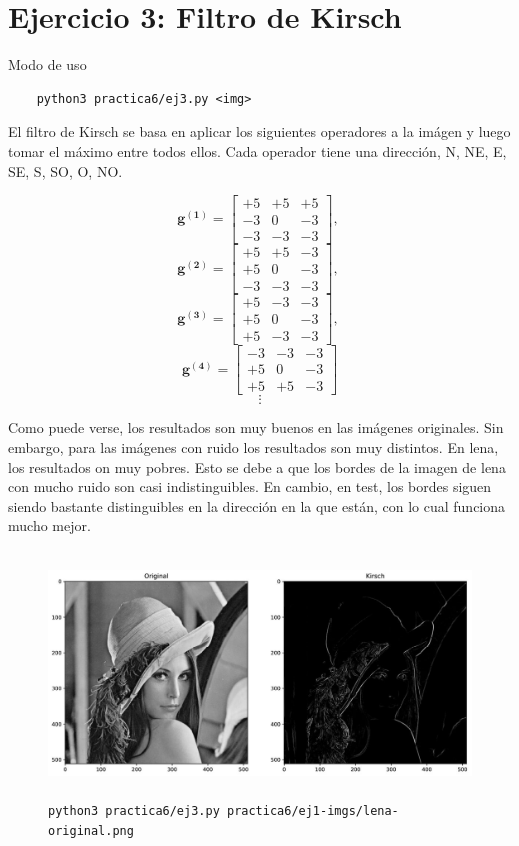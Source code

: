 \documentclass[11pt, spanish]{article}
\begin{document}
\newpage
\section{Ejercicio 3: Filtro de Kirsch}

Modo de uso
\begin{verbatim}
    python3 practica6/ej3.py <img>
\end{verbatim}

El filtro de Kirsch se basa en aplicar los siguientes operadores a la imágen y luego tomar el máximo entre todos ellos. Cada operador tiene una dirección, N, NE, E, SE, S, SO, O, NO. 

\[
\mathbf{g^{(1)}} = \begin{bmatrix} 
+5 & +5 & +5 \\
-3 &  0 & -3 \\
-3 & -3 & -3 
\end{bmatrix},\
\]
\[
\mathbf{g^{(2)}} = \begin{bmatrix} 
+5 & +5 & -3 \\
+5 &  0 & -3 \\
-3 & -3 & -3 
\end{bmatrix},\ 
\]
\[
\mathbf{g^{(3)}} = \begin{bmatrix} 
+5 & -3 & -3 \\
+5 &  0 & -3 \\
+5 & -3 & -3 
\end{bmatrix},\ 
\]
\[
\mathbf{g^{(4)}} = \begin{bmatrix} 
-3 & -3 & -3 \\
+5 &  0 & -3 \\
+5 & +5 & -3 
\end{bmatrix}
\]
\[
\vdots
\]

Como puede verse, los resultados son muy buenos en las imágenes originales. Sin embargo, para las imágenes con ruido los resultados son muy distintos. En lena, los resultados on muy pobres. Esto se debe a que los bordes de la imagen de lena con mucho ruido son casi indistinguibles. En cambio, en test, los bordes siguen siendo bastante distinguibles en la dirección en la que están, con lo cual funciona mucho mejor.

\begin{figure}[H]
\centering
    \includegraphics[height=6.5cm]{informe-imgs/ej3--lena-original.jpg}
    \caption{\texttt{python3 practica6/ej3.py practica6/ej1-imgs/lena-original.png }}
\end{figure}
\end{document}
